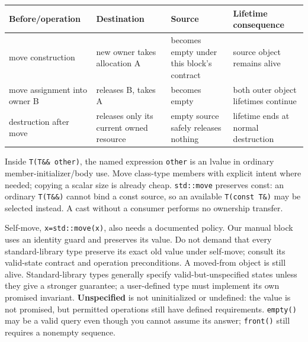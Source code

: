 {\def\LTcaptype{none} %
\begin{longtable}[]{@{}
  >{\raggedright\arraybackslash}p{}
  >{\raggedright\arraybackslash}p{}
  >{\raggedright\arraybackslash}p{}
  >{\raggedright\arraybackslash}p{}@{}}
\toprule\noalign{}
\begin{minipage}[b]{\linewidth}\raggedright
Before/operation
\end{minipage} & \begin{minipage}[b]{\linewidth}\raggedright
Destination
\end{minipage} & \begin{minipage}[b]{\linewidth}\raggedright
Source
\end{minipage} & \begin{minipage}[b]{\linewidth}\raggedright
Lifetime consequence
\end{minipage} \\
\midrule\noalign{}
\endhead
\bottomrule\noalign{}
\endlastfoot
move construction & new owner takes allocation A & becomes empty under this block's contract & source object remains alive \\
move assignment into owner B & releases B, takes A & becomes empty & both outer object lifetimes continue \\
destruction after move & releases only its current owned resource & empty source safely releases nothing & lifetime ends at normal destruction \\
\end{longtable}
}

Inside \texttt{T(T\&\&\ other)}, the named expression \texttt{other} is an lvalue in ordinary member-initializer/body use. Move class-type members with explicit intent where needed; copying a scalar size is already cheap. \texttt{std::move} preserves const: an ordinary \texttt{T(T\&\&)} cannot bind a const source, so an available \texttt{T(const\ T\&)} may be selected instead. A cast without a consumer performs no ownership transfer.

Self-move, \texttt{x=std::move(x)}, also needs a documented policy. Our manual block uses an identity guard and preserves its value. Do not demand that every standard-library type preserve its exact old value under self-move; consult its valid-state contract and operation preconditions. A moved-from object is still alive. Standard-library types generally specify valid-but-unspecified states unless they give a stronger guarantee; a user-defined type must implement its own promised invariant. \textbf{Unspecified} is not uninitialized or undefined: the value is not promised, but permitted operations still have defined requirements. \texttt{empty()} may be a valid query even though you cannot assume its answer; \texttt{front()} still requires a nonempty sequence.

